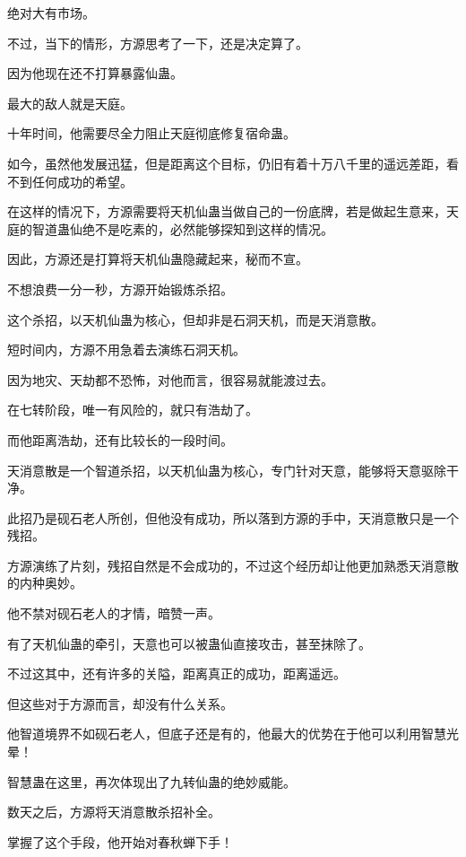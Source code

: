 \begin{this_body}
绝对大有市场。

不过，当下的情形，方源思考了一下，还是决定算了。

因为他现在还不打算暴露仙蛊。

最大的敌人就是天庭。

十年时间，他需要尽全力阻止天庭彻底修复宿命蛊。

如今，虽然他发展迅猛，但是距离这个目标，仍旧有着十万八千里的遥远差距，看不到任何成功的希望。

在这样的情况下，方源需要将天机仙蛊当做自己的一份底牌，若是做起生意来，天庭的智道蛊仙绝不是吃素的，必然能够探知到这样的情况。

因此，方源还是打算将天机仙蛊隐藏起来，秘而不宣。

不想浪费一分一秒，方源开始锻炼杀招。

这个杀招，以天机仙蛊为核心，但却非是石洞天机，而是天消意散。

短时间内，方源不用急着去演练石洞天机。

因为地灾、天劫都不恐怖，对他而言，很容易就能渡过去。

在七转阶段，唯一有风险的，就只有浩劫了。

而他距离浩劫，还有比较长的一段时间。

天消意散是一个智道杀招，以天机仙蛊为核心，专门针对天意，能够将天意驱除干净。

此招乃是砚石老人所创，但他没有成功，所以落到方源的手中，天消意散只是一个残招。

方源演练了片刻，残招自然是不会成功的，不过这个经历却让他更加熟悉天消意散的内种奥妙。

他不禁对砚石老人的才情，暗赞一声。

有了天机仙蛊的牵引，天意也可以被蛊仙直接攻击，甚至抹除了。

不过这其中，还有许多的关隘，距离真正的成功，距离遥远。

但这些对于方源而言，却没有什么关系。

他智道境界不如砚石老人，但底子还是有的，他最大的优势在于他可以利用智慧光晕！

智慧蛊在这里，再次体现出了九转仙蛊的绝妙威能。

数天之后，方源将天消意散杀招补全。

掌握了这个手段，他开始对春秋蝉下手！

\end{this_body}

